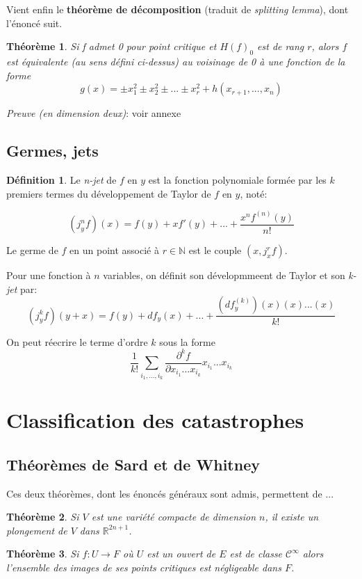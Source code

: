 \documentclass{article}
\newcommand{\cinf}{\mathcal{C}^\infty}
\newcommand{\R}{\mathbb{R}}
\newcommand{\N}{\mathbb{N}}
\theoremstyle{definition}
\newtheorem{defn}{Définition}
\theoremstyle{plain}
\newtheorem{thm}{Théorème}
\begin{document}
Vient enfin le \textbf{théorème de décomposition} (traduit de \textit{splitting lemma}), dont l'énoncé suit.

\begin{thm}
Si f admet 0 pour point critique et $H(f)_0$ est de rang $r$, alors $f$ est équivalente (au sens défini ci-dessus) au voisinage de 0 à une fonction de la forme $$g(x)=\pm x_1^2\pm x_2^2\pm ... \pm x_r^2 + h(x_{r+1},...,x_n)$$
\end{thm}

\textit{Preuve (en dimension deux)}: voir annexe


\subsection{Germes, jets}

\begin{defn}
Le \textit{n-jet} de $f$ en $y$ est la fonction polynomiale formée par les $k$ premiers termes du développement de Taylor de $f$ en $y$, noté:

$$(j^n_y f)(x) = f(y) + xf'(y)+...+\frac{x^n f^{(n)}(y)}{n!}$$

Le germe de $f$ en un point associé à $r\in\N$ est le couple $(x,j^r_x f)$.
\end{defn}

Pour une fonction à $n$ variables, on définit son dévelopmmeent de Taylor et son \textit{k-jet} par: $$(j^k_y f)(y+x) = f(y) + df_y(x)+...+\frac{(df^{(k)}_y)(x)(x)...(x)}{k!}$$

On peut réecrire le terme d'ordre $k$ sous la forme $$\frac{1}{k!}\sum_{i_1,...,i_k} \frac{\partial^k f}{\partial x_{i_1}...x_{i_k}} x_{i_1}...x_{i_k}$$

\section{Classification des catastrophes}
\subsection{Théorèmes de Sard et de Whitney}
Ces deux théorèmes, dont les énoncés généraux sont admis, permettent de ...

\begin{thm}
	Si $V$ est une variété compacte de dimension $n$, il existe un plongement de $V$ dans $\R^{2n+1}$.
\end{thm}

\begin{thm}
	Si $f: U\to F$ où $U$ est un ouvert de $E$ est de classe $\cinf$ alors l'ensemble des images de ses points critiques est négligeable dans $F$.
\end{thm}
\end{document}
